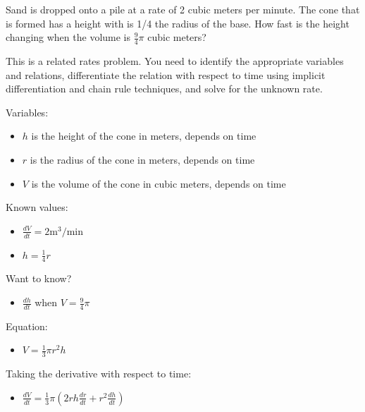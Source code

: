 \documentclass{ximera}
\author{Emma Smith Zbarsky}
\begin{document}
\begin{exercise}

Sand is dropped onto a pile at a rate of 2 cubic meters per minute. The
cone that is formed has a height with is 1/4 the radius of the base. How
fast is the height changing when the volume is $\frac{9}{4}\pi$ cubic
meters?


\begin{hint}
This is a related rates problem. You need to identify the appropriate
variables and relations, differentiate the relation with respect to time
using implicit differentiation and chain rule techniques, and solve for
the unknown rate.
\end{hint}


\begin{hint}
Variables:

\begin{itemize}
\item
  $h$ is the height of the cone in meters, depends on time
\item
  $r$ is the radius of the cone in meters, depends on time
\item
  $V$ is the volume of the cone in cubic meters, depends on time
\end{itemize}

Known values:

\begin{itemize}
\item
  $\frac{dV}{dt} = 2 \mbox{m}^3/\mbox{min}$
\item
  $h = \frac{1}{4}r$
\end{itemize}

Want to know?

\begin{itemize}
\itemsep1pt\parskip0pt
\item
  $\frac{dh}{dt}$ when $V=\frac{9}{4}\pi$
\end{itemize}

Equation:

\begin{itemize}
\itemsep1pt\parskip0pt
\item
  $V = \frac{1}{3}\pi r^2h$
\end{itemize}

Taking the derivative with respect to time:

\begin{itemize}
\itemsep1pt\parskip0pt
\item
  $\frac{dV}{dt} = \frac{1}{3}\pi\left(2rh\frac{dr}{dt}+r^2\frac{dh}{dt}\right)$
\end{itemize}


\end{hint}
\end{exercise}
\end{document}
